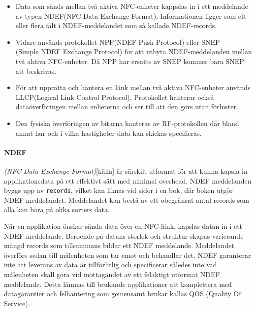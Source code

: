 \documentclass[11pt]{article}
\begin{document}
\begin{itemize}
\item Data som sänds mellan två aktiva NFC-enheter kappslas in i ett meddelande av typen NDEF(NFC Data Exchange Format). Informationen ligger som ett eller flera fält i NDEF-meddelandet som så kallade NDEF-records. 

\item Vidare används protokollet NPP(NDEF Push Protocol) eller SNEP\\(Simple NDEF Exchange Protocol) för att utbyta NDEF-meddelanden mellan två aktiva NFC-enheter. Då NPP har ersatts av SNEP kommer bara SNEP att beskrivas.

\item För att upprätta och hantera en länk mellan två aktiva NFC-enheter används LLCP(Logical Link Control Protocol). Protokollet hanterar också dataöverföringen mellan enheterna och ser till att den görs utan förluster.

\item Den fysiska överföringen av bitarna hanteras av RF-protokollen där bland annat hur och i vilka hastigheter data kan skickas specifieras.

\end{itemize}


\paragraph{NDEF}

\textit{(NFC Data Exchange Format)}[källa] är särskilt utformat för att kunna kapsla in applikationsdata på ett effektivt sätt med minimal overhead. NDEF meddelanden byggs upp av \texttt{records}, vilket kan liknas vid sidor i en bok, där boken utgör NDEF meddelandet. Meddelandet kan bestå av ett obegränsat antal records som alla kan bära på olika sorters data.  

När en applikation önskar sända data över en NFC-länk, kapslas datan in i ett NDEF meddelande. Beroende på datans storlek och struktur skapas varierande mängd records som tillsammans bildar ett NDEF meddelande. Meddelandet överförs sedan till målenheten som tar emot och behandlar det. NDEF garanterar inte att leverans av data är tillförlitlig och specificerar således inte vad målenheten skall göra vid mottagandet av ett felaktigt utformat NDEF meddelande. Detta lämnas till brukande applikationer att komplettera med datagarantier och felhantering som gemensamt brukar kallas QOS (Quality Of Service).
\end{document}
